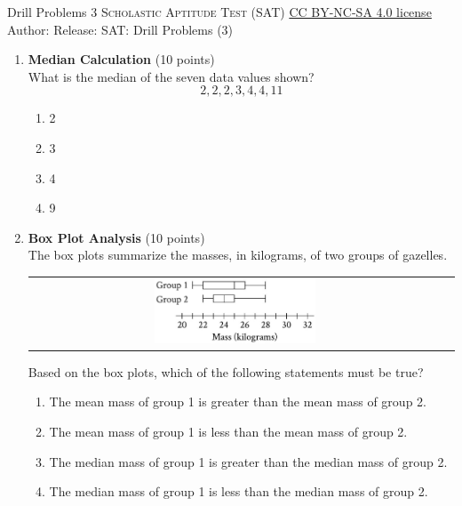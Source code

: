 \newpage\handout
{Drill Problems 3}
{\textsc{Scholastic Aptitude Test (SAT)}}
{\href{https://creativecommons.org/licenses/by-nc-sa/4.0/}{CC BY-NC-SA 4.0 license}}
{Author: \BookAuthor}{Release: \generatedOn}
{SAT: Drill Problems (3)}



\begin{enumerate}
  \item \textbf{Median Calculation} (10 points)\\
  What is the median of the seven data values shown?
  \[
  2,2,2,3,4,4,11
  \]
  \begin{enumerate}[label=(\Alph*)]
    \item 2
    \item 3
    \item 4
    \item 9
  \end{enumerate}
  \begin{subanswer}
  \end{subanswer}

  \item \textbf{Box Plot Analysis} (10 points)\\
  The box plots summarize the masses, in kilograms, of two groups of gazelles.
  \begin{table}[h!]
  \centering
  \renewcommand{\arraystretch}{1.3}
  \setlength{\tabcolsep}{8pt}
  \begin{tabular}{cc}
  \includegraphics[width=0.4\textwidth]{images/2025_06_15_04f7426dc644de311e92g-02} &
  \end{tabular}
  \end{table}
  Based on the box plots, which of the following statements must be true?
  \begin{enumerate}[label=(\Alph*)]
    \item The mean mass of group 1 is greater than the mean mass of group 2.
    \item The mean mass of group 1 is less than the mean mass of group 2.
    \item The median mass of group 1 is greater than the median mass of group 2.
    \item The median mass of group 1 is less than the median mass of group 2.
  \end{enumerate}
  \begin{subanswer}
  \end{subanswer}


\end{enumerate}
